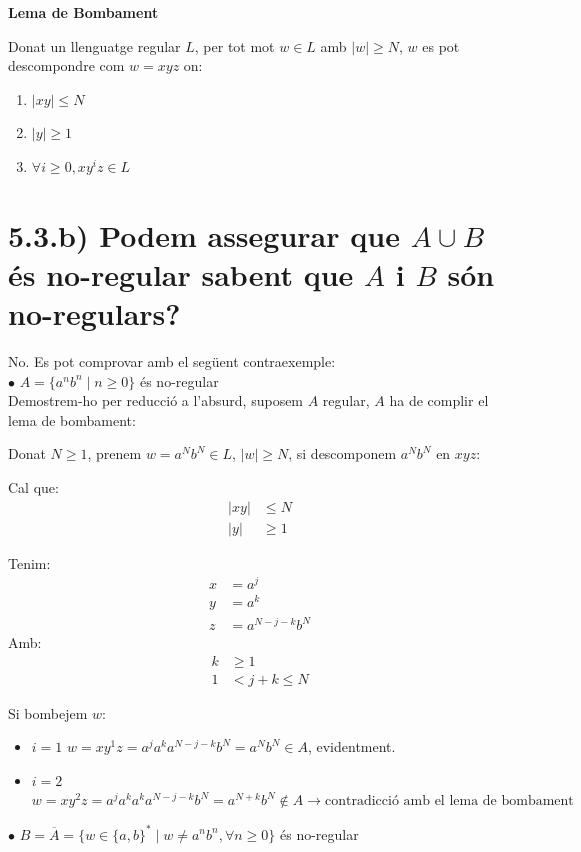 \documentclass{article}
\begin{document}
\begin{tcolorbox}
\textbf{Lema de Bombament}

Donat un llenguatge regular $L$, per tot mot $w \in L$ amb $|w| \geq N$, $w$ es pot descompondre com $w = xyz$ on:
\begin{enumerate}
    \item $|xy| \leq N$
    \item $|y| \geq 1$
    \item $\forall i \geq 0, xy^iz \in L$
\end{enumerate}
\end{tcolorbox}

\section*{\small 5.3.b) Podem assegurar que $A\cup B$ és no-regular sabent que $A$ i $B$ són no-regulars?}

No. Es pot comprovar amb el següent contraexemple:\\

$\bullet$ $A = \{a^n b^n \mid n \geq 0\}$ és no-regular \\
Demostrem-ho per reducció a l'absurd, suposem $A$ regular, $A$ ha de complir el lema de bombament:

Donat $N \geq 1$, prenem $w = a^Nb^N \in L$, $|w| \geq N$, si descomponem $a^Nb^N$ en $xyz$:

Cal que:
\begin{align*}
  |xy| &\leq N \\
  |y| &\geq 1
\end{align*}

Tenim:
\begin{align*}
  x &= a^j \\
  y &= a^k \\
  z &= a^{N-j-k}b^N
\end{align*}
Amb:
\begin{align*}
  k &\geq 1 \\
  1 &< j + k \leq N
\end{align*}

Si bombejem $w$:
\begin{itemize}
\item $i = 1$
\subitem $w = xy^1z = a^j a^k a^{N-j-k}b^N = a^Nb^N \in A$, evidentment.
\end{itemize}

\begin{itemize}
\item $i = 2$
\subitem $w = xy^2z = a^j a^k a^k a^{N-j-k}b^N = a^{N+k}b^N \notin A \rightarrow \text{contradicció amb el lema de bombament}$\\
\end{itemize}
$\bullet$ $B = \overline A = \{w \in \{a,b\}^* \mid w \neq a^n b^n, \forall n \geq 0\}$ és no-regular
\end{document}
